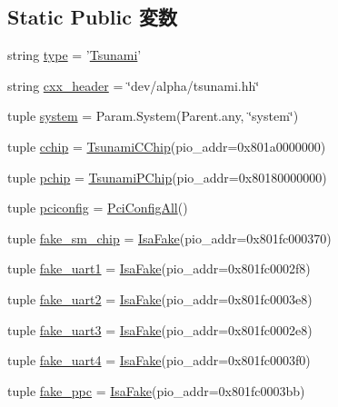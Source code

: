 \subsection*{Static Public 変数}
\begin{DoxyCompactItemize}
\item 
string \hyperlink{classTsunami_1_1Tsunami_acce15679d830831b0bbe8ebc2a60b2ca}{type} = '\hyperlink{classTsunami_1_1Tsunami}{Tsunami}'
\item 
string \hyperlink{classTsunami_1_1Tsunami_a17da7064bc5c518791f0c891eff05fda}{cxx\_\-header} = \char`\"{}dev/alpha/tsunami.hh\char`\"{}
\item 
tuple \hyperlink{classTsunami_1_1Tsunami_ab737471139f5a296e5b26e8a0e1b0744}{system} = Param.System(Parent.any, \char`\"{}system\char`\"{})
\item 
tuple \hyperlink{classTsunami_1_1Tsunami_ac1636e20fc3bb3fadc00255ad114ce3f}{cchip} = \hyperlink{classTsunami_1_1TsunamiCChip}{TsunamiCChip}(pio\_\-addr=0x801a0000000)
\item 
tuple \hyperlink{classTsunami_1_1Tsunami_a73949d263d2a10394d96cd92a6d5bd00}{pchip} = \hyperlink{classTsunami_1_1TsunamiPChip}{TsunamiPChip}(pio\_\-addr=0x80180000000)
\item 
tuple \hyperlink{classTsunami_1_1Tsunami_af76b12e7e603a8ef5f908080bb3e6fab}{pciconfig} = \hyperlink{classPciConfigAll}{PciConfigAll}()
\item 
tuple \hyperlink{classTsunami_1_1Tsunami_a4a3cebaa5998d4c154d24975a018e8fc}{fake\_\-sm\_\-chip} = \hyperlink{classIsaFake}{IsaFake}(pio\_\-addr=0x801fc000370)
\item 
tuple \hyperlink{classTsunami_1_1Tsunami_a729c2a5c6baea4c0fdd2de7da0a9ce84}{fake\_\-uart1} = \hyperlink{classIsaFake}{IsaFake}(pio\_\-addr=0x801fc0002f8)
\item 
tuple \hyperlink{classTsunami_1_1Tsunami_a5055b407ff1689f84877a5a30c3b8c0b}{fake\_\-uart2} = \hyperlink{classIsaFake}{IsaFake}(pio\_\-addr=0x801fc0003e8)
\item 
tuple \hyperlink{classTsunami_1_1Tsunami_ab33d23184cd2f845e4bdeb569b938f4b}{fake\_\-uart3} = \hyperlink{classIsaFake}{IsaFake}(pio\_\-addr=0x801fc0002e8)
\item 
tuple \hyperlink{classTsunami_1_1Tsunami_adad25ad3019493d124ac17ae6fab5e9c}{fake\_\-uart4} = \hyperlink{classIsaFake}{IsaFake}(pio\_\-addr=0x801fc0003f0)
\item 
tuple \hyperlink{classTsunami_1_1Tsunami_abcc3b9280d89a3a3366182db8668cf0b}{fake\_\-ppc} = \hyperlink{classIsaFake}{IsaFake}(pio\_\-addr=0x801fc0003bb)

\end{DoxyCompactItemize}
